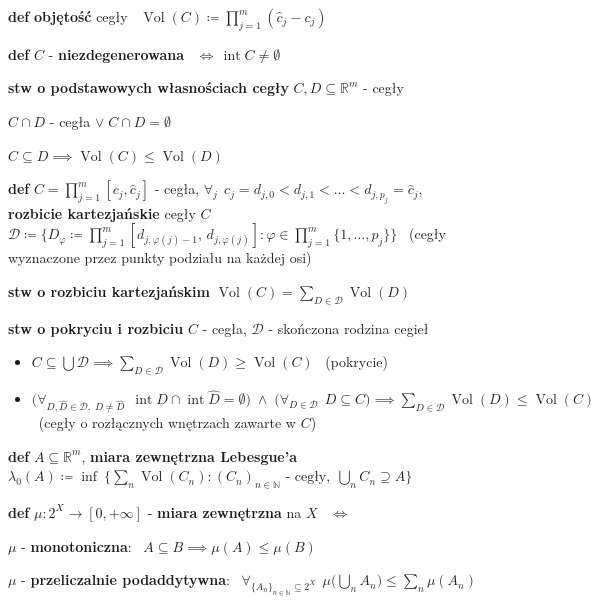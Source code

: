 \documentclass[a4paper,12pt]{article}
\begin{document}
\smallskip
\textbf{def} \; \textbf{objętość} cegły \, \(\operatorname{Vol}(C) \coloneqq \prod_{j=1}^{m} (\hat{c}_j - c_j)\)

\smallskip
\textbf{def} \; \(C\) - \textbf{niezdegenerowana} \, \(\iff \, \operatorname{int} C \neq \emptyset\)

\bigskip
\textbf{stw o podstawowych własnościach cegły} \; \(C, D \subseteq \mathbb{R}^m\) - cegły
\begin{podpunkty}
    \item \(C \cap D\) - cegła \(\lor \; C \cap D = \emptyset\)
    \item \(C \subseteq D \implies \operatorname{Vol}(C) \leq \operatorname{Vol}(D)\)
\end{podpunkty}

\bigskip
\textbf{def} \; \(C = \prod_{j=1}^{m} [c_j, \hat{c}_j]\) - cegła, \; \(\forall_j \;\, c_j = d_{j,0} < d_{j,1} < \dots < d_{j,p_j} = \hat{c}_j\), \\ \textbf{rozbicie kartezjańskie} cegły \(C\) \, \(\mathcal{D} \coloneqq \{D_\varphi \coloneqq \prod_{j=1}^{m} [d_{j,\varphi(j)-1}, \, d_{j,\varphi(j)}] : \varphi \in \prod_{j=1}^{m} \{1, \dots, p_j\}\}\) \, (cegły wyznaczone przez punkty podziału na każdej osi)

\bigskip
\textbf{stw o rozbiciu kartezjańskim} \; \(\operatorname{Vol}(C) = \sum_{D \in \mathcal{D}} \operatorname{Vol}(D)\)

\bigskip
\textbf{stw o pokryciu i rozbiciu} \; \(C\) - cegła, \; \(\mathcal{D}\) - skończona rodzina cegieł
\begin{itemize}
    \item \(C \subseteq \bigcup \mathcal{D} \implies \sum_{D \in \mathcal{D}} \operatorname{Vol}(D) \geq \operatorname{Vol}(C)\) \, (pokrycie)
    \item \(\big(\forall_{D, \hat{D} \in \mathcal{D}, \; D \neq \hat{D}} \;\, \operatorname{int} D \cap \operatorname{int} \hat{D} = \emptyset\big) \; \land \; \big(\forall_{D \in \mathcal{D}} \;\, D \subseteq C\big) \implies \sum_{D \in \mathcal{D}} \operatorname{Vol}(D) \leq \operatorname{Vol}(C)\) \, (cegły o rozłącznych wnętrzach zawarte w \(C\))
\end{itemize}

\bigskip
\textbf{def} \; \(A \subseteq \mathbb{R}^m\), \; \textbf{miara zewnętrzna Lebesgue'a} \, \(\lambda_0(A) \coloneqq \inf \ \{\sum_n \operatorname{Vol}(C_n) : (C_n)_{n \in \mathbb{N}} \text{ - cegły}, \; \bigcup_n C_n \supseteq A\}\)

\bigskip
\textbf{def} \; \(\mu: 2^X \to [0, +\infty]\) - \textbf{miara zewnętrzna} na \(X\) \, \(\iff\)
\begin{podpunkty}
    \item \(\mu\) - \textbf{monotoniczna}: \, \(A \subseteq B \implies \mu(A) \leq \mu(B)\)
    \item \(\mu\) - \textbf{przeliczalnie podaddytywna}: \, \(\forall_{\{A_n\}_{n \in \mathbb{N}} \subseteq 2^X} \;\, \mu\big(\bigcup_n A_n\big) \leq \sum_n \mu(A_n)\)
\end{podpunkty}
\end{document}
